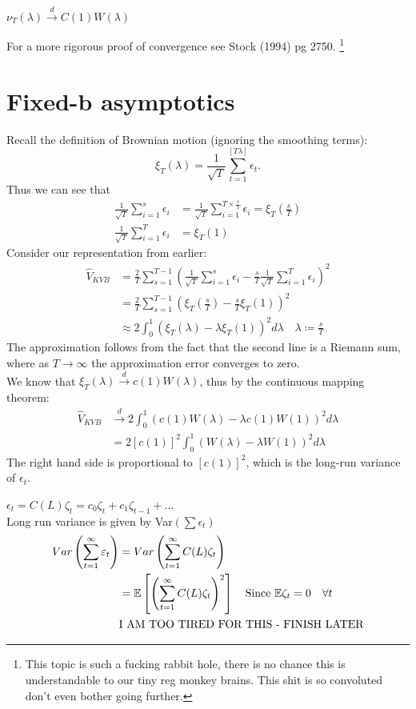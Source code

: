 \documentclass[DIV=14,titlepage=false]{scrreprt}
\begin{document}
\begin{theorem}
    $\nu_T(\lambda) \xrightarrow{d} C(1)W(\lambda)$
\end{theorem}
For a more rigorous proof of convergence see Stock (1994) pg 2750. \footnote{This topic is such a fucking rabbit hole, there is no chance this is understandable to our tiny reg monkey brains. This shit is so convoluted don't even bother going further.}
\section{Fixed-b asymptotics}
Recall the definition of Brownian motion (ignoring the smoothing terms): \[ \xi_T(\lambda) = \frac{1}{\sqrt{T}} \sum_{t=1}^{[T\lambda]} \epsilon_t.\]
Thus we can see that
\begin{align*}
    \frac{1}{\sqrt{T}}\sum_{i=1}^{s}\epsilon_i  &= \frac{1}{\sqrt{T}}\sum_{i=1}^{T\times \frac{s}{T}}\epsilon_i
    = \xi_T(\frac{s}{T})\\
    \frac{1}{\sqrt{T}} \sum_{i=1}^{T}\epsilon_i &= \xi_T(1)
\end{align*}
Consider our representation from earlier:
\begin{align*}
    \hat V_{KVB} &= \frac{2}{T} \sum_{s=1}^{T-1} \left(\frac{1}{\sqrt{T}}\sum_{i=1}^{s}\epsilon_i -\frac{s}{T}\frac{1}{\sqrt{T}} \sum_{i=1}^{T}\epsilon_i\right)^2\\
    &= \frac{2}{T} \sum_{s=1}^{T-1} \left(\xi_T(\frac{s}{T}) -\frac{s}{T}\xi_T(1)\right)^2\\
    &\approx 2 \int_{0}^{1} \left(\xi_T(\lambda) -\lambda\xi_T(1)\right)^2 d \lambda \quad \lambda \coloneqq \frac{s}{T}
\end{align*}
The approximation follows from the fact that the second line is a Riemann sum, where as $T \to \infty$ the approximation error converges to zero.\\
We know that $\xi_T(\lambda) \xrightarrow{d} c(1)W(\lambda)$, thus by the continuous mapping theorem:
\begin{align*}
    \hat V_{KVB} &\xrightarrow{d} 2 \int_{0}^{1} \left(c(1)W(\lambda) -\lambda c(1)W(1)\right)^2 d \lambda\\
    &= 2 [c(1)]^2 \int_{0}^{1} \left(W(\lambda) -\lambda W(1)\right)^2 d \lambda
\end{align*}
The right hand side is proportional to $[c(1)]^2$, which is the long-run variance of $\epsilon_t$.\\
\begin{example}
    $\epsilon_t=C(L)\zeta_t = c_0 \zeta_t + c_1 \zeta_{t-1} + \dots$\\
    Long run variance is given by Var$(\sum \epsilon_t)$
    \begin{align*}
        Var\left(\sum_{t=1}^{\infty} \varepsilon_t\right) &=  Var\left(\sum_{t=1}^{\infty} C(L)\zeta_t\right)\\
        &= \mathbb{E}\left[\left(\sum_{t=1}^{\infty} C(L)\zeta_t\right)^2\right] \quad \text{Since $\mathbb{E} \zeta_t = 0 \quad \forall t$}\\
        &\text{I AM TOO TIRED FOR THIS - FINISH LATER}
    \end{align*}
\end{example}
\end{document}
